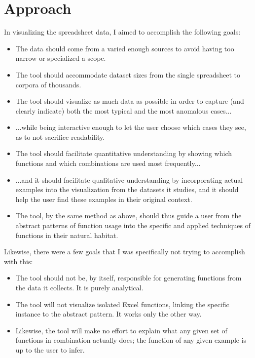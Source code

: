 \documentclass[conference]{IEEEtran}
\begin{document}
\section{Approach}
In visualizing the spreadsheet data, I aimed to accomplish the following goals:
\begin{itemize}
	\item The data should come from a varied enough sources to avoid having too narrow or specialized a scope.
	\item The tool should accommodate dataset sizes from the single spreadsheet to corpora of thousands.
	\item The tool should visualize as much data as possible in order to capture (and clearly indicate) both the most typical and the most anomalous cases...
	\item ...while being interactive enough to let the user choose which cases they see, as to not sacrifice readability.
	\item The tool should facilitate quantitative understanding by showing which functions and which combinations are used most frequently...
	\item ...and it should facilitate qualitative understanding by incorporating actual examples into the visualization from the datasets it studies, and it should help the user find these examples in their original context.
	\item The tool, by the same method as above, should thus guide a user from the abstract patterns of function usage into the specific and applied techniques of functions in their natural habitat.
\end{itemize} \par
Likewise, there were a few goals that I was specifically not trying to accomplish with this:
\begin{itemize}
	\item The tool should not be, by itself, responsible for generating functions from the data it collects. It is purely analytical.
	\item The tool will not visualize isolated Excel functions, linking the specific instance to the abstract pattern. It works only the other way.
	\item Likewise, the tool will make no effort to explain what any given set of functions in combination actually does; the function of any given example is up to the user to infer.
\end{itemize}
\end{document}
